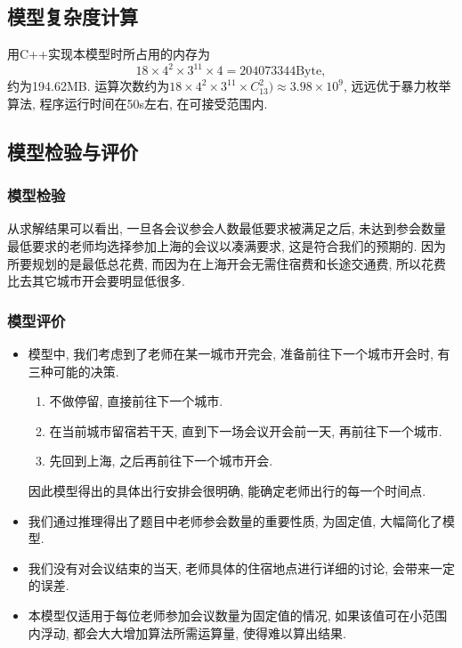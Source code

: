 \subsection{模型复杂度计算}
    用C++实现本模型时所占用的内存为\[18\times 4^2\times3^{11}\times4=204073344\text{Byte},\]
    约为194.62MB. 运算次数约为$18\times 4^2\times 3^{11}\times C_{13}^2)\approx 3.98\times 10^9$,
    远远优于暴力枚举算法, 程序运行时间在50s左右, 在可接受范围内.
\subsection{模型检验与评价}
    \subsubsection{模型检验}
        从求解结果可以看出, 一旦各会议参会人数最低要求被满足之后,
        未达到参会数量最低要求的老师均选择参加上海的会议以凑满要求, 这是符合我们的预期的.
        因为所要规划的是最低总花费, 而因为在上海开会无需住宿费和长途交通费,
        所以花费比去其它城市开会要明显低很多.
    \subsubsection{模型评价}
            \begin{itemize}
                \item 模型中, 我们考虑到了老师在某一城市开完会, 准备前往下一个城市开会时,
                        有三种可能的决策.
                        \begin{enumerate}
                            \item 不做停留, 直接前往下一个城市.
                            \item 在当前城市留宿若干天, 直到下一场会议开会前一天, 再前往下一个城市.
                            \item 先回到上海, 之后再前往下一个城市开会.
                        \end{enumerate}
                        
                        因此模型得出的具体出行安排会很明确, 能确定老师出行的每一个时间点.
                        
                \item 我们通过推理得出了题目中老师参会数量的重要性质, 为固定值, 大幅简化了模型.
            \end{itemize}
            \begin{itemize}
                \item 我们没有对会议结束的当天, 老师具体的住宿地点进行详细的讨论, 会带来一定的误差.
                \item 本模型仅适用于每位老师参加会议数量为固定值的情况, 如果该值可在小范围内浮动,
                        都会大大增加算法所需运算量, 使得难以算出结果.
            \end{itemize}